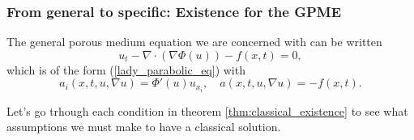\documentclass[11pt, a4paper]{article}
\begin{document}
\subsubsection{From general to specific: Existence for the GPME}
The general porous medium equation we are concerned with can be written
\begin{equation*}
u_t - \nabla \cdot (\nabla \Phi(u) ) - f(x,t) = 0,
\end{equation*}
which is of the form (\ref{lady_parabolic_eq}) with
\begin{equation}
a_i(x,t,u,\nabla u) = \Phi'(u) u_{x_i}, \quad a(x,t,u,\nabla u) = -f(x,t).
\end{equation}


Let's go trhough each condition in theorem \ref{thm:classical_existence} to see what assumptions we must make to have a classical solution.
\end{document}
